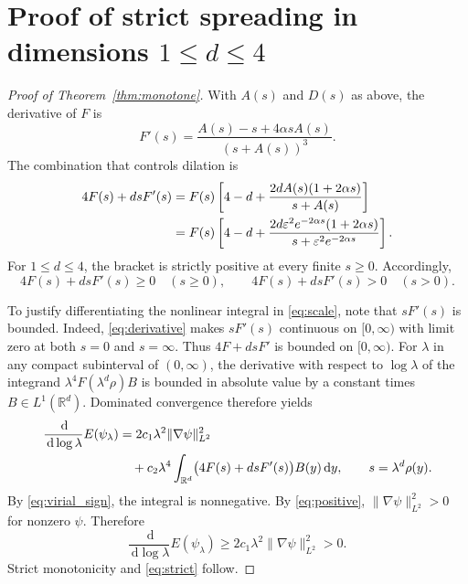 \documentclass[11pt]{article}
\newcommand{\R}{\mathbb{R}}
\newcommand{\dd}{\,\mathrm{d}}
\begin{document}
\section{Proof of strict spreading in dimensions $1\le d\le4$}
\begin{proof}[Proof of Theorem~\ref{thm:monotone}]
With $A(s)$ and $D(s)$ as above, the derivative of $F$ is
\begin{equation}\label{eq:derivative}
 F'(s)=\frac{A(s)-s+4\alpha sA(s)}{(s+A(s))^3}.
\end{equation}
The combination that controls dilation is
\begin{align}
 4F(s)+dsF'(s)
 &=F(s)\left[
 4-d+\frac{2dA(s)(1+2\alpha s)}{s+A(s)}
 \right] \notag\\
 &=F(s)\left[
 4-d+\frac{2d\varepsilon^2e^{-2\alpha s}(1+2\alpha s)}
 {s+\varepsilon^2e^{-2\alpha s}}
 \right].\label{eq:virial_weight}
\end{align}
For $1\le d\le4$, the bracket is strictly positive at every
finite $s\ge0$. Accordingly,
\begin{equation}\label{eq:virial_sign}
 4F(s)+dsF'(s)\ge0\quad(s\ge0),
 \qquad 4F(s)+dsF'(s)>0\quad(s>0).
\end{equation}

To justify differentiating the nonlinear integral in
\eqref{eq:scale}, note that $sF'(s)$ is bounded. Indeed,
\eqref{eq:derivative} makes $sF'(s)$ continuous on
$[0,\infty)$ with limit zero at both $s=0$ and $s=\infty$.
Thus $4F+dsF'$ is bounded on $[0,\infty)$.
For $\lambda$ in any compact subinterval of $(0,\infty)$,
the derivative with respect to $\log\lambda$ of the
integrand $\lambda^4F(\lambda^d\rho)B$ is bounded in
absolute value by a constant times $B\in L^1(\R^d)$.
Dominated convergence therefore yields
\begin{align}
 \frac{\dd}{\dd\log\lambda}E(\psi_\lambda)
 &=2c_1\lambda^2\|\nabla\psi\|_{L^2}^2\notag\\
 &\quad+c_2\lambda^4\int_{\R^d}
 \bigl(4F(s)+dsF'(s)\bigr)B(y)\dd y,
 \qquad s=\lambda^d\rho(y).
 \label{eq:monotone_derivative}
\end{align}
By \eqref{eq:virial_sign}, the integral is nonnegative.
By \eqref{eq:positive}, $\|\nabla\psi\|_{L^2}^2>0$ for
nonzero $\psi$. Therefore
\begin{equation}\label{eq:positive_derivative}
 \boxed{\frac{\dd}{\dd\log\lambda}E(\psi_\lambda)
 \ge2c_1\lambda^2\|\nabla\psi\|_{L^2}^2>0.}
\end{equation}
Strict monotonicity and \eqref{eq:strict} follow.


\end{proof}
\end{document}
